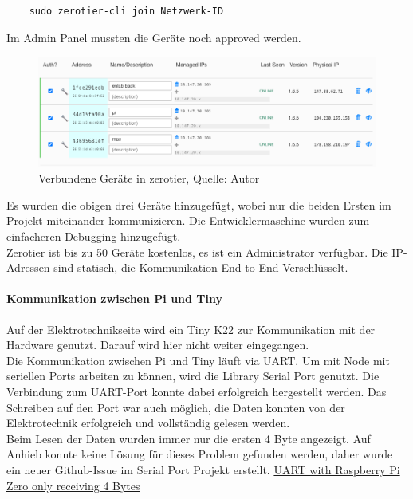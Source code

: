 \begin{verbatim}
	sudo zerotier-cli join Netzwerk-ID
\end{verbatim}
Im Admin Panel mussten die Geräte noch approved werden.
\begin{figure}[H]
	\centering
	\includegraphics[width=1\textwidth]{images/zerotier.PNG}
	\caption[Verbundene Geräte in zerotier]{Verbundene Geräte in zerotier, Quelle: Autor}
	\label{img: zerotier}
\end{figure} 
Es wurden die obigen drei Geräte hinzugefügt, wobei nur die beiden Ersten im Projekt miteinander kommunizieren. Die Entwicklermaschine wurden zum einfacheren Debugging hinzugefügt. \\
Zerotier ist bis zu 50 Geräte kostenlos, es ist ein Administrator verfügbar. Die IP-Adressen sind statisch, die Kommunikation End-to-End Verschlüsselt.

\paragraph{Kommunikation zwischen Pi und Tiny}\label{kommTiny}
Auf der Elektrotechnikseite wird ein Tiny K22 zur Kommunikation mit der Hardware genutzt. Darauf wird hier nicht weiter eingegangen. \\
Die Kommunikation zwischen Pi und Tiny läuft via \ac{UART}. Um mit Node mit seriellen Ports arbeiten zu können, wird die Library Serial Port genutzt. 
Die Verbindung zum \ac{UART}-Port konnte dabei erfolgreich hergestellt werden. Das Schreiben auf den Port war auch möglich, die Daten konnten von der Elektrotechnik erfolgreich und vollständig gelesen werden. \\
Beim Lesen der Daten wurden immer nur die ersten 4 Byte angezeigt. Auf Anhieb konnte keine Lösung für dieses Problem gefunden werden, daher wurde ein neuer \gls{Github}-Issue im Serial Port Projekt erstellt. 
\href{https://github.com/serialport/node-serialport/issues/2252}{UART with Raspberry Pi Zero only receiving 4 Bytes}\\\\

